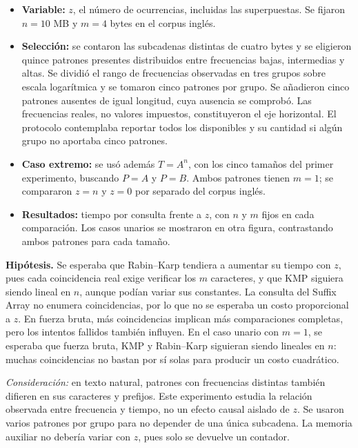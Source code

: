 \begin{itemize}
    \item \textbf{Variable:} \(z\), el número de ocurrencias, incluidas las
    superpuestas. Se fijaron \(n=10\) MB y \(m=4\) bytes en el corpus inglés.
    \item \textbf{Selección:} se contaron las subcadenas distintas de cuatro
    bytes y se eligieron quince patrones presentes distribuidos entre
    frecuencias bajas, intermedias y altas. Se dividió el rango de frecuencias
    observadas en tres grupos sobre escala logarítmica y se tomaron cinco patrones
    por grupo. Se añadieron cinco patrones ausentes de igual longitud, cuya ausencia
    se comprobó. Las frecuencias reales, no valores impuestos, constituyeron el eje
    horizontal. El protocolo contemplaba reportar todos los disponibles y su cantidad
    si algún grupo no aportaba cinco patrones.
    \item \textbf{Caso extremo:} se usó además \(T=A^n\), con los cinco
    tamaños del primer experimento, buscando \(P=A\) y \(P=B\). Ambos patrones
    tienen \(m=1\); se compararon \(z=n\) y \(z=0\) por separado del corpus inglés.
    \item \textbf{Resultados:} tiempo por consulta frente a \(z\), con \(n\)
    y \(m\) fijos en cada comparación. Los casos unarios se mostraron en otra
    figura, contrastando ambos patrones para cada tamaño.
\end{itemize}

\textbf{Hipótesis.} Se esperaba que Rabin--Karp tendiera a aumentar su tiempo
con \(z\), pues cada coincidencia real exige verificar los \(m\) caracteres,
y que KMP siguiera siendo lineal en \(n\), aunque podían variar sus constantes.
La consulta del Suffix Array no enumera coincidencias, por lo que no se esperaba un costo proporcional
a \(z\). En fuerza bruta, más coincidencias implican más comparaciones completas,
pero los intentos fallidos también influyen. En el caso unario con \(m=1\),
se esperaba que fuerza bruta, KMP y Rabin--Karp siguieran siendo lineales en \(n\): muchas
coincidencias no bastan por sí solas para producir un costo cuadrático.

\textit{Consideración:} en texto natural, patrones con frecuencias distintas
también difieren en sus caracteres y prefijos. Este experimento estudia la
relación observada entre frecuencia y tiempo, no un efecto causal aislado de
\(z\). Se usaron varios patrones por grupo para no depender de una única
subcadena. La memoria auxiliar no debería variar con \(z\), pues solo se
devuelve un contador.
